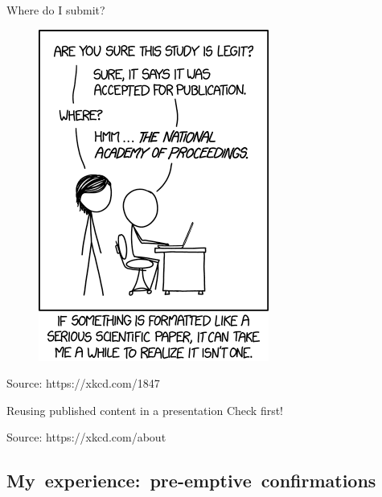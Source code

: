 \documentclass[10pt]{beamer}
\begin{document}
\begin{frame}{Where do I submit?}
	\begin{figure}
		\includegraphics[trim={0pt 60pt 0pt 0pt}, clip, width=0.5\columnwidth]{images/xkcdjournal}
	\end{figure}
    \hfill \tiny{Source: https://xkcd.com/1847}
\end{frame}

\begin{frame}{Reusing published content in a presentation}
	\alert{Check first!}
	\begin{figure}
	\end{figure}
    \hfill \tiny{Source: https://xkcd.com/about}
\end{frame}

\subsection{\mbox{My experience: pre-emptive confirmations}}
\end{document}
